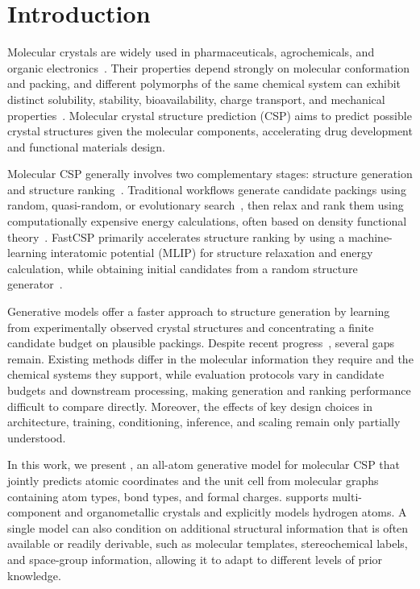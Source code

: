 \section{Introduction}

Molecular crystals are widely used in pharmaceuticals, agrochemicals, and organic electronics~\citep{beran2023frontiers}. Their properties depend strongly on molecular conformation and packing, and different polymorphs of the same chemical system can exhibit distinct solubility, stability, bioavailability, charge transport, and mechanical properties~\citep{price2014predicting,jin2025oxtal,gharakhanyan2025fastcsp}. Molecular crystal structure prediction (CSP) aims to predict possible crystal structures given the molecular components, accelerating drug development and functional materials design.

Molecular CSP generally involves two complementary stages: structure generation and structure ranking~\citep{hunnisett2024seventhranking,hunnisett2024seventhgeneration}. Traditional workflows generate candidate packings using random, quasi-random, or evolutionary search~\citep{li2018genarris,curtis2018gator}, then relax and rank them using computationally expensive energy calculations, often based on density functional theory~\citep{price2014predicting,reilly2016sixth,hunnisett2024seventhranking,hunnisett2024seventhgeneration}. FastCSP primarily accelerates structure ranking by using a machine-learning interatomic potential (MLIP) for structure relaxation and energy calculation, while obtaining initial candidates from a random structure generator~\citep{gharakhanyan2025fastcsp}.

Generative models offer a faster approach to structure generation by learning from experimentally observed crystal structures and concentrating a finite candidate budget on plausible packings. Despite recent progress~\citep{jin2025oxtal,zeng2026molcrystalflow,subramanian2026packflow,lo2026clari}, several gaps remain. Existing methods differ in the molecular information they require and the chemical systems they support, while evaluation protocols vary in candidate budgets and downstream processing, making generation and ranking performance difficult to compare directly. Moreover, the effects of key design choices in architecture, training, conditioning, inference, and scaling remain only partially understood.

In this work, we present \model{}, an all-atom generative model for molecular CSP that jointly predicts atomic coordinates and the unit cell from molecular graphs containing atom types, bond types, and formal charges. \model{} supports multi-component and organometallic crystals and explicitly models hydrogen atoms. A single model can also condition on additional structural information that is often available or readily derivable, such as molecular templates, stereochemical labels, and space-group information, allowing it to adapt to different levels of prior knowledge.

